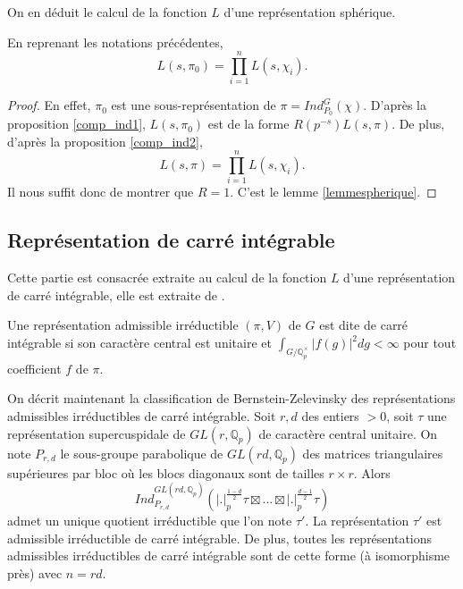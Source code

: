 On en déduit le calcul de la fonction $L$ d'une représentation sphérique.
\begin{proposition}
En reprenant les notations précédentes,
\begin{equation}
L(s, \pi_0) = \prod_{i=1}^n L(s, \chi_i).
\end{equation}
\end{proposition}

\begin{proof}
En effet, $\pi_0$ est une sous-représentation de $\pi=Ind_{P_0}^G(\chi)$. D'après la proposition \ref{comp_ind1}, $L(s, \pi_0)$ est de la forme $R(p^{-s})L(s, \pi)$. De plus, d'après la proposition \ref{comp_ind2},
\begin{equation}
L(s, \pi) = \prod_{i=1}^n L(s, \chi_i).
\end{equation}
Il nous suffit donc de montrer que $R=1$. C'est le lemme \ref{lemmespherique}.
\end{proof}

\subsection{Représentation de carré intégrable}

Cette partie est consacrée extraite au calcul de la fonction $L$ d'une représentation de carré intégrable, elle est extraite de \cite{goldfeld-hundley}.

\begin{definition}
Une représentation admissible irréductible $(\pi, V)$ de $G$ est dite de carré intégrable si son caractère central est unitaire et $\int_{G/\mathbb{Q}_p^\times} |f(g)|^2 dg < \infty$ pour tout coefficient $f$ de $\pi$.
\end{definition}

On décrit maintenant la classification de Bernstein-Zelevinsky des représentations admissibles irréductibles de carré intégrable. Soit $r,d$ des entiers $> 0$, soit $\tau$ une représentation supercuspidale de $GL(r, \mathbb{Q}_p)$ de caractère central unitaire. On note $P_{r,d}$ le sous-groupe parabolique de $GL(rd, \mathbb{Q}_p)$ des matrices triangulaires supérieures par bloc où les blocs diagonaux sont de tailles $r \times r$. Alors
\begin{equation}
Ind_{P_{r,d}}^{GL(rd, \mathbb{Q}_p)}(|.|_p^{\frac{1-d}{2}}\tau \boxtimes ... \boxtimes |.|_p^{\frac{d-1}{2}}\tau)
\end{equation}
admet un unique quotient irréductible que l'on note $\tau'$. La représentation $\tau'$ est admissible irréductible de carré intégrable. De plus, toutes les représentations admissibles irréductibles de carré intégrable sont de cette forme (à isomorphisme près) avec $n=rd$.

